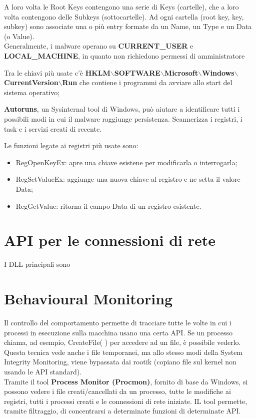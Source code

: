 \documentclass[a4paper]{book}
\begin{document}
A loro volta le Root Keys contengono una serie di Keys (cartelle), che a loro volta contengono delle Subkeys (sottocartelle). Ad ogni cartella (root key, key, subkey) sono associate una o più entry formate da un Name, un Type e un Data (o Value). 
\\

Generalmente, i malware operano su \textbf{CURRENT\_USER} e \textbf{LOCAL\_MACHINE}, in quanto non richiedono permessi di amministratore

Tra le chiavi più usate c'è \textbf{HKLM$\backslash$SOFTWARE$\backslash$Microsoft$\backslash$Windows$\backslash$CurrentVersion$\backslash$Run} che contiene i programmi da avviare allo start del sistema operativo;
 
\textbf{Autoruns}, un Sysinternal tool di Windows, può aiutare a identificare tutti i possibili modi in cui il malware raggiunge persistenza. Scannerizza i registri, i task e i servizi creati di recente.

Le funzioni legate ai registri più usate sono:
\begin{itemize}
    \item RegOpenKeyEx: apre una chiave esistene per modificarla o interrogarla;
    \item RegSetValueEx: aggiunge una nuova chiave al registro e ne setta il valore Data;
    \item RegGetValue: ritorna il campo Data di un registro esistente.
\end{itemize}

\section{API per le connessioni di rete}
I DLL principali sono

\section{Behavioural Monitoring}
Il controllo del comportamento permette di tracciare tutte le volte in cui i processi in esecuzione sulla macchina usano una certa API. Se un processo chiama, ad esempio, CreateFile( ) per accedere ad un file, è possibile vederlo. Questa tecnica vede anche i file temporanei, ma allo stesso modi della System Integrity Monitoring, viene bypassata dai rootik (copiano file sul kernel non usando le API standard). 
\\

Tramite il tool \textbf{Process Monitor (Procmon)}, fornito di base da Windows, si possono vedere i file creati/cancellati da un processo, tutte le modifiche ai registri, tutti i processi creati e le connessioni di rete iniziate. IL tool permette, tramite filtraggio, di concentrarsi a determinate funzioni di determinate API.
\end{document}
